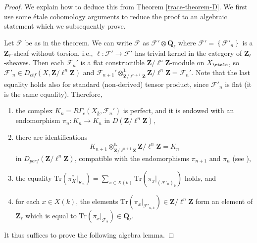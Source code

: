 \begin{proof}

We explain how to deduce this from Theorem \ref{trace-theorem-D}.
We first use some \'etale cohomology arguments to reduce the proof
to an algebraic statement which we subsequently prove.

\medskip\noindent
Let $\mathcal{F}$ be as in the theorem. We can write
$\mathcal{F}$ as
$\mathcal{F}'\otimes \mathbf{Q}_\ell$ where $\mathcal{F}' =
\left\{\mathcal{F}'_n\right\}$ is a $\mathbf{Z}_\ell$-sheaf without torsion,
i.e., $\ell : \mathcal{F}'\to \mathcal{F}'$ has trivial kernel in the
category of $\mathbf{Z}_\ell$-sheaves. Then each $\mathcal{F}_n'$ is a flat
constructible $\mathbf{Z}/\ell^n\mathbf{Z}$-module on $X_\etale$, so
$\mathcal{F}'_n \in D_{ctf}(X, \mathbf{Z}/\ell^n\mathbf{Z})$ and
$\mathcal{F}_{n+1}'
\otimes^{\mathbf{L}}_{\mathbf{Z}/\ell^{n+1}\mathbf{Z}}
\mathbf{Z}/\ell^n\mathbf{Z} = \mathcal{F}_n'$.
Note that the last equality holds also
for standard (non-derived) tensor product, since $\mathcal{F}'_n$ is flat
(it is the same equality). Therefore,
\begin{enumerate}
\item
the complex $K_n = R\Gamma_c\left(X_{\bar k}, \mathcal{F}_n'\right)$ is perfect,
and it is endowed with an endomorphism $\pi_n : K_n\to K_n$ in
$D(\mathbf{Z}/\ell^n\mathbf{Z})$,
\item
there are identifications
$$
K_{n+1}
\otimes^{\mathbf{L}}_{\mathbf{Z}/\ell^{n+1}\mathbf{Z}}
\mathbf{Z}/\ell^n\mathbf{Z}
=
K_n
$$
in $D_{perf}(\mathbf{Z}/\ell^n\mathbf{Z})$, compatible with the endomorphisms
$\pi_{n+1}$ and $\pi_n$ (see \cite[Rapport 4.12]{SGA4.5}),
\item
the equality $\text{Tr}\left(\pi_X^* |_{K_n}\right) =
\sum_{x\in X(k)} \text{Tr}\left(\pi_x |_{(\mathcal{F}'_n)_{\bar x}}\right)$
holds, and
\item
for each $x\in X(k)$, the elements
$\text{Tr}(\pi_x |_{\mathcal{F}'_{n, \bar x}}) \in \mathbf{Z}/\ell^n\mathbf{Z}$
form an element of
$\mathbf{Z}_\ell$ which is equal to
$\text{Tr}(\pi_x |_{\mathcal{F}_{\bar x}}) \in \mathbf{Q}_\ell$.
\end{enumerate}
It thus suffices to prove the following algebra lemma.
\end{proof}

